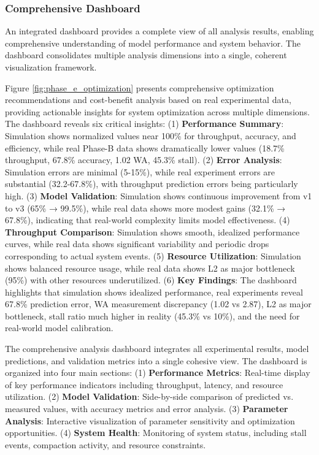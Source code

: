 \documentclass[11pt]{article}
\begin{document}
\subsubsection{Comprehensive Dashboard}
An integrated dashboard provides a complete view of all analysis results, enabling comprehensive understanding of model performance and system behavior. The dashboard consolidates multiple analysis dimensions into a single, coherent visualization framework.

Figure \ref{fig:phase_e_optimization} presents comprehensive optimization recommendations and cost-benefit analysis based on real experimental data, providing actionable insights for system optimization across multiple dimensions. The dashboard reveals six critical insights: (1) \textbf{Performance Summary}: Simulation shows normalized values near 100\% for throughput, accuracy, and efficiency, while real Phase-B data shows dramatically lower values (18.7\% throughput, 67.8\% accuracy, 1.02 WA, 45.3\% stall). (2) \textbf{Error Analysis}: Simulation errors are minimal (5-15\%), while real experiment errors are substantial (32.2-67.8\%), with throughput prediction errors being particularly high. (3) \textbf{Model Validation}: Simulation shows continuous improvement from v1 to v3 (65\% → 99.5\%), while real data shows more modest gains (32.1\% → 67.8\%), indicating that real-world complexity limits model effectiveness. (4) \textbf{Throughput Comparison}: Simulation shows smooth, idealized performance curves, while real data shows significant variability and periodic drops corresponding to actual system events. (5) \textbf{Resource Utilization}: Simulation shows balanced resource usage, while real data shows L2 as major bottleneck (95\%) with other resources underutilized. (6) \textbf{Key Findings}: The dashboard highlights that simulation shows idealized performance, real experiments reveal 67.8\% prediction error, WA measurement discrepancy (1.02 vs 2.87), L2 as major bottleneck, stall ratio much higher in reality (45.3\% vs 10\%), and the need for real-world model calibration.

The comprehensive analysis dashboard integrates all experimental results, model predictions, and validation metrics into a single cohesive view. The dashboard is organized into four main sections: (1) \textbf{Performance Metrics}: Real-time display of key performance indicators including throughput, latency, and resource utilization. (2) \textbf{Model Validation}: Side-by-side comparison of predicted vs. measured values, with accuracy metrics and error analysis. (3) \textbf{Parameter Analysis}: Interactive visualization of parameter sensitivity and optimization opportunities. (4) \textbf{System Health}: Monitoring of system status, including stall events, compaction activity, and resource constraints.
\end{document}
